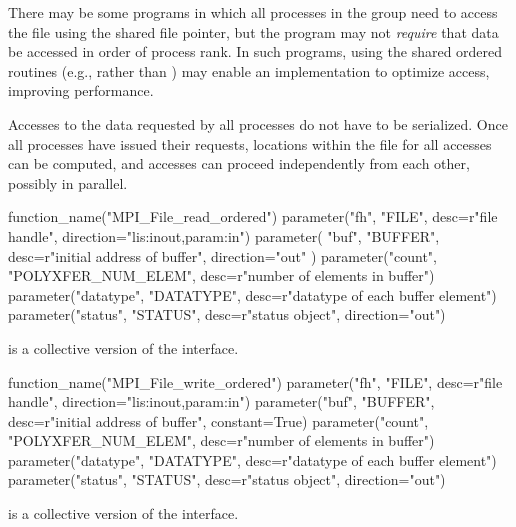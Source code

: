 \begin{users}
There may be some programs in which all processes in the
group
need to access the
file using the shared file pointer, but the program may not \emph{require}
that data be accessed in order of process rank.
In such programs, using the shared ordered routines
(e.g., 
rather than )
may enable an implementation to optimize access, improving performance.
\end{users}

\begin{implementors}
Accesses to the data requested by all processes do not have to be serialized. 
Once all processes have issued their requests, locations within the file for
all accesses can be computed, and accesses can proceed independently from each
other, possibly in parallel.
\end{implementors}


%
%
\begin{mpi-binding}
    function_name("MPI_File_read_ordered")
    parameter("fh", "FILE", desc=r"file handle", direction="lis:inout,param:in")
    parameter(
        "buf", "BUFFER", desc=r"initial address of buffer", direction="out"
    )
    parameter("count", "POLYXFER_NUM_ELEM", desc=r"number of elements in buffer")
    parameter("datatype", "DATATYPE", desc=r"datatype of each buffer element")
    parameter("status", "STATUS", desc=r"status object", direction="out")
\end{mpi-binding}

 is a collective version of the
 interface.

%
%
\begin{mpi-binding}
    function_name("MPI_File_write_ordered")
    parameter("fh", "FILE", desc=r"file handle", direction="lis:inout,param:in")
    parameter("buf", "BUFFER", desc=r"initial address of buffer", constant=True)
    parameter("count", "POLYXFER_NUM_ELEM", desc=r"number of elements in buffer")
    parameter("datatype", "DATATYPE", desc=r"datatype of each buffer element")
    parameter("status", "STATUS", desc=r"status object", direction="out")
\end{mpi-binding}

 is a collective version of the
 interface.

